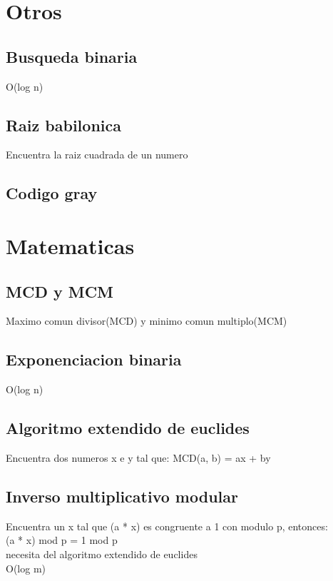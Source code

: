 \documentclass[10pt,landscape,twocolumn,a4paper,notitlepage]{article}
\newcommand\cppfile[2][]{

}
\begin{document}
		\section{Otros}
			\subsection{Busqueda binaria}
			O(log n)
			\cppfile[7-22]{otros/busqueda_binaria.cpp}
			\subsection{Raiz babilonica}
			Encuentra la raiz cuadrada de un numero
			\cppfile[4-12]{otros/raiz_babilonica.cpp}
			\subsection{Codigo gray}
			\cppfile[5-14]{otros/codigo_gray.cpp}
			
		\section{Matematicas}
			\subsection{MCD y MCM}
			Maximo comun divisor(MCD) y minimo comun multiplo(MCM)
			\cppfile[5-11]{matematicas/MCD_y_MCM.cpp}
			\subsection{Exponenciacion binaria}
			O(log n)
			\cppfile[4-15]{matematicas/exponenciacion_binaria.cpp}
			\subsection{Algoritmo extendido de euclides}
			Encuentra dos numeros x e y tal que: MCD(a, b) = ax + by
			\cppfile[5-24]{matematicas/algoritmo_extendido_de_euclides.cpp}
			\subsection{Inverso multiplicativo modular}
			Encuentra un x tal que (a * x) es congruente a 1 con modulo p,
				entonces:\\ (a * x) mod p = 1 mod p\\
				necesita del algoritmo extendido de euclides\\
			O(log m)
			\cppfile[17-27]{matematicas/inverso_multiplicativo_modular.cpp}
\end{document}

